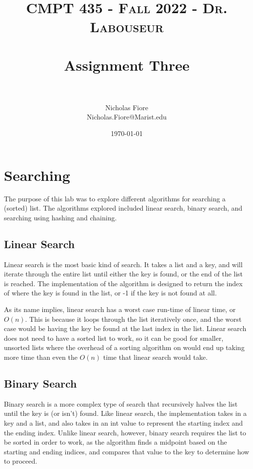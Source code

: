 \documentclass[letterpaper, 10pt,DIV=13]{scrartcl}
\title{	
   \normalfont \normalsize 
   \textsc{CMPT 435 - Fall 2022 - Dr. Labouseur} \\[10pt] %
   \horrule{0.5pt} \\[0.25cm] 	%
   \huge Assignment Three  \\     	    %
   \horrule{0.5pt} \\[0.25cm] 	%
}
\author{Nicholas Fiore \\ \normalsize Nicholas.Fiore@Marist.edu}
\date{\normalsize\today} 	%
\numberwithin{equation}{section} %
\numberwithin{figure}{section} %
\numberwithin{table}{section} %
\begin{document}
\maketitle %

\section{Searching}
The purpose of this lab was to explore different algorithms for searching a (sorted) list. The algorithms explored included linear search, binary search, and searching using hashing and chaining.

\subsection{Linear Search}
Linear search is the most basic kind of search. It takes a list and a key, and will iterate through the entire list until either the key is found, or the end of the list is reached. The implementation of the algorithm is designed to return the index of where the key is found in the list, or -1 if the key is not found at all.

As its name implies, linear search has a worst case run-time of linear time, or $O(n)$. This is because it loops through the list iteratively once, and the worst case would be having the key be found at the last index in the list. Linear search does not need to have a sorted list to work, so it can be good for smaller, unsorted lists where the overhead of a sorting algorithm on would end up taking more time than even the $O(n)$ time that linear search would take.

\subsection{Binary Search}
Binary search is a more complex type of search that recursively halves the list until the key is (or isn't) found. Like linear search, the implementation takes in a key and a list, and also takes in an int value to represent the starting index and the ending index. Unlike linear search, however, binary search requires the list to be sorted in order to work, as the algorithm finds a midpoint based on the starting and ending indices, and compares that value to the key to determine how to proceed.
\end{document}

